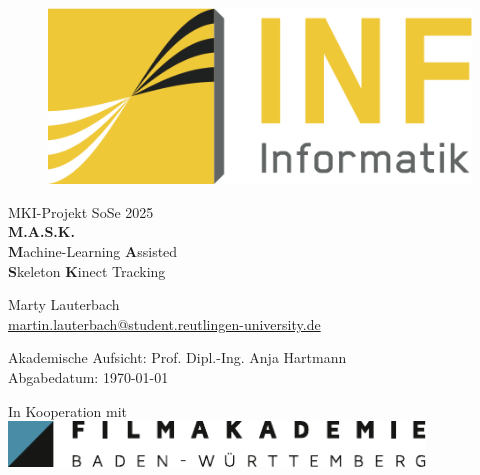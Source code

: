 \begin{titlepage}
	\begin{figure}
		\begin{flushright}
			\includegraphics[scale=0.75]{images/INFLogo.png}
		\end{flushright}
	\end{figure}

	{\centering
		
		\vspace{3.5cm}
		{\Large  MKI-Projekt SoSe 2025}\\
		\vspace{1cm}
		{\LARGE{\textbf{M.A.S.K.}} \\
        \vspace{0.5cm}
        \textbf{\color{Goldenrod}M}achine-Learning \textbf{\color{Goldenrod}A}ssisted \\
        \textbf{\color{Goldenrod}S}keleton \textbf{\color{Goldenrod}K}inect Tracking \\
        }
        
		\vspace{5cm}
		Marty Lauterbach\\
		\href{mailto:martin.lauterbach@student.reutlingen-university.de}{martin.lauterbach@student.reutlingen-university.de}\\
        \vspace{0.2cm}
        
		Akademische Aufsicht: Prof. Dipl.-Ing. Anja Hartmann \\
		
		\vspace{0.2cm}
		{\small Abgabedatum: \today}\\

        \vspace{2.5cm}
        \begin{center}
        In Kooperation mit\\
        \vspace{0.3cm}
        \includegraphics[height=1.2cm]{images/FAWB.pdf}
        \end{center}
	}
	

\end{titlepage}
